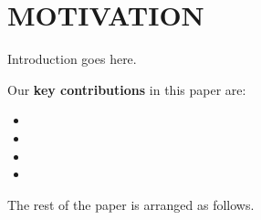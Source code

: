 \section{MOTIVATION}

Introduction goes here.

Our \textbf{key contributions} in this paper are:

\begin{itemize}
\item 
\item 
\item 
\item 
\end{itemize}

The rest of the paper is arranged as
follows. 
